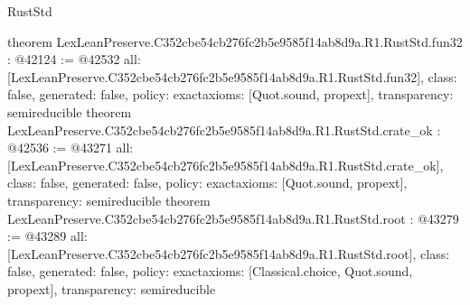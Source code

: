 \begin{lexlean}{RustStd}
\begin{coremodule}
{}
theorem LexLeanPreserve.C352cbe54cb276fc2b5e9585f14ab8d9a.R1.RustStd.fun32 : @42124 := @42532 {
  all: [LexLeanPreserve.C352cbe54cb276fc2b5e9585f14ab8d9a.R1.RustStd.fun32],
  class: false,
  generated: false,
  policy: exact{axioms: [Quot.sound, propext]},
  transparency: semireducible
}
theorem LexLeanPreserve.C352cbe54cb276fc2b5e9585f14ab8d9a.R1.RustStd.crate_ok : @42536 := @43271 {
  all: [LexLeanPreserve.C352cbe54cb276fc2b5e9585f14ab8d9a.R1.RustStd.crate_ok],
  class: false,
  generated: false,
  policy: exact{axioms: [Quot.sound, propext]},
  transparency: semireducible
}
theorem LexLeanPreserve.C352cbe54cb276fc2b5e9585f14ab8d9a.R1.RustStd.root : @43279 := @43289 {
  all: [LexLeanPreserve.C352cbe54cb276fc2b5e9585f14ab8d9a.R1.RustStd.root],
  class: false,
  generated: false,
  policy: exact{axioms: [Classical.choice, Quot.sound, propext]},
  transparency: semireducible
}


\end{coremodule}
\end{lexlean}
